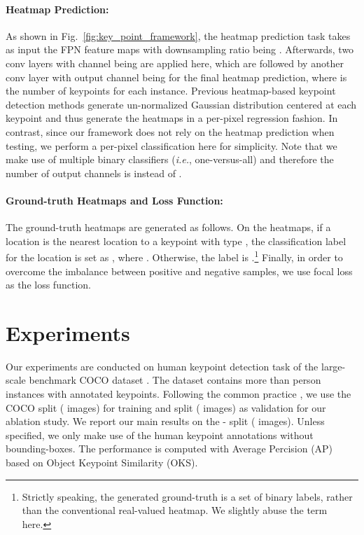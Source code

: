 \documentclass[10pt,twocolumn,letterpaper]{article}
\renewcommand{\texttt}[1]{}
\def\ie{{\it i.e.}\xspace}
\newcommand{\1}{{\mathbbm{1}}}
\begin{document}
{\paragraph{Heatmap Prediction:} As shown in Fig.~\ref{fig:key_point_framework}, the heatmap prediction task takes as input the FPN feature maps  with downsampling ratio being . Afterwards, two  conv layers with channel being  are applied here, which are followed by another  conv layer with output channel being  for the final heatmap prediction, where  is the number of keypoints for each instance. Previous heatmap-based keypoint detection methods \cite{cao2017realtime} generate un-normalized Gaussian distribution centered at each keypoint and thus generate the heatmaps in a per-pixel regression fashion. In contrast, since our framework does not
rely
on the heatmap prediction when testing, we
perform
a per-pixel classification here for simplicity. Note that we make use of multiple binary classifiers (\ie, one-versus-all) and therefore the number of output channels is  instead of .



\paragraph{Ground-truth Heatmaps and Loss Function:} The ground-truth heatmaps are generated as follows. On the heatmaps, if a location is the nearest location to a keypoint with type , the classification label for the location is set as , where . Otherwise, the label is .\footnote{Strictly speaking, the generated ground-truth is a set of binary labels, rather than the conventional real-valued
        heatmap. We slightly abuse the term here.
}
Finally, in order to overcome the imbalance between positive and negative samples, we use focal loss \cite{lin2017focal} as the loss function.

\section{Experiments}
Our experiments are conducted on human keypoint detection task of the large-scale benchmark COCO dataset \cite{lin2014microsoft}. The dataset contains more than  person instances with  annotated keypoints. Following the common practice \cite{cao2017realtime, he2017mask}, we use the COCO  \texttt{trainval35k} split ( images) for training and \texttt{minival} split ( images) as validation for our ablation study. We report our main results on the \texttt{test}-\texttt{dev} split ( images). Unless specified, we only make use of the human keypoint annotations without bounding-boxes. The performance is computed with Average Percision (AP) based on Object Keypoint Similarity (OKS).
}
\end{document}
